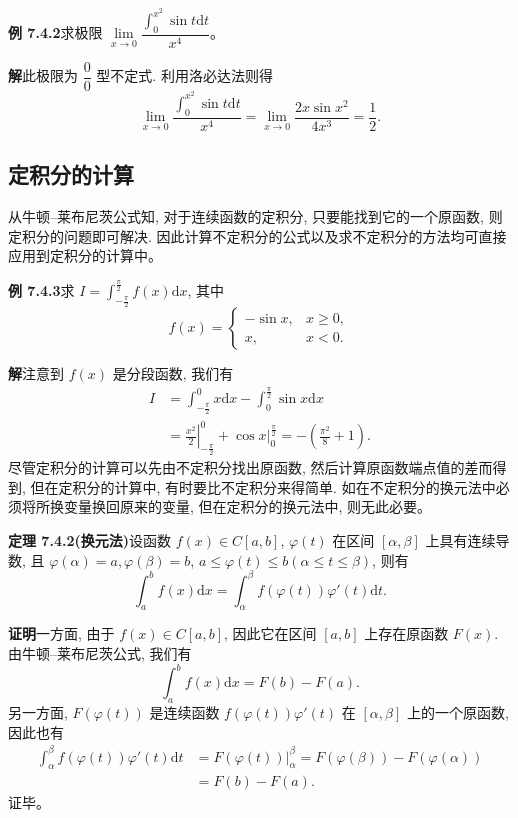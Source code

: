 \documentclass[UTF8,12pt,a4paper,fontset=fandol]{ctexart}
\begin{document}
\noindent\textbf{例 7.4.2}\quad 求极限 $\lim\limits_{x\to0}\dfrac{\int_0^{x^2}\sin t\mathrm dt}{x^4}$。

\noindent\textbf{解}\quad 此极限为 $\dfrac{0}{0}$ 型不定式. 利用洛必达法则得
\[
  \lim_{x\to0}\frac{\int_0^{x^2}\sin t\mathrm dt}{x^4}
  =\lim_{x\to0}\frac{2x\sin x^2}{4x^3}=\frac{1}{2}.
\]

\subsection{定积分的计算}

从牛顿--莱布尼茨公式知, 对于连续函数的定积分, 只要能找到它的一个原函数, 则定积分的问题即可解决. 因此计算不定积分的公式以及求不定积分的方法均可直接应用到定积分的计算中。

\noindent\textbf{例 7.4.3}\quad 求 $I=\int_{-\frac{\pi}{2}}^{\frac{\pi}{2}} f(x)\mathrm dx$, 其中
\[
  f(x)=
  \begin{cases}
    -\sin x, & x\geq0,\\
    x, & x<0.
  \end{cases}
\]

\noindent\textbf{解}\quad 注意到 $f(x)$ 是分段函数, 我们有
\[
\begin{aligned}
  I&=\int_{-\frac{\pi}{2}}^0 x\mathrm dx-\int_0^{\frac{\pi}{2}}\sin x\mathrm dx\\
  &=\left.\frac{x^2}{2}\right|_{-\frac{\pi}{2}}^0+\left.\cos x\right|_0^{\frac{\pi}{2}}
  =-\left(\frac{\pi^2}{8}+1\right).
\end{aligned}
\]
尽管定积分的计算可以先由不定积分找出原函数, 然后计算原函数端点值的差而得到, 但在定积分的计算中, 有时要比不定积分来得简单. 如在不定积分的换元法中必须将所换变量换回原来的变量, 但在定积分的换元法中, 则无此必要。

\noindent\textbf{定理 7.4.2(换元法)}\quad 设函数 $f(x)\in C[a,b]$, $\varphi(t)$ 在区间 $[\alpha,\beta]$ 上具有连续导数, 且 $\varphi(\alpha)=a,\varphi(\beta)=b$, $a\leq\varphi(t)\leq b(\alpha\leq t\leq\beta)$, 则有
\[
  \int_a^b f(x)\mathrm dx=\int_\alpha^\beta f(\varphi(t))\varphi'(t)\mathrm dt.
\]

\noindent\textbf{证明}\quad 一方面, 由于 $f(x)\in C[a,b]$, 因此它在区间 $[a,b]$ 上存在原函数 $F(x)$. 由牛顿--莱布尼茨公式, 我们有
\[
  \int_a^b f(x)\mathrm dx=F(b)-F(a).
\]
另一方面, $F(\varphi(t))$ 是连续函数 $f(\varphi(t))\varphi'(t)$ 在 $[\alpha,\beta]$ 上的一个原函数, 因此也有
\[
\begin{aligned}
  \int_\alpha^\beta f(\varphi(t))\varphi'(t)\mathrm dt
  &=\left.F(\varphi(t))\right|_\alpha^\beta
  =F(\varphi(\beta))-F(\varphi(\alpha))\\
  &=F(b)-F(a).
\end{aligned}
\]
证毕。
\end{document}
